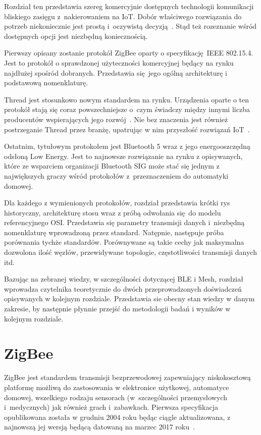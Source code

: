 Rozdział ten przedstawia szereg komercyjnie dostępnych technologii komunikacji
bliskiego zasięgu z~nakierowaniem na \gls{IoT}. Dobór właściwego rozwiązania do potrzeb
niekoniecznie jest prostą i~oczywistą decyzją~\cite{lethaby_wireless_2017, ray_edge_2019}.
Stąd też rozeznanie wśród dostępnych opcji jest niezbędną koniecznością.

Pierwszy opisany zostanie protokół ZigBee oparty o specyfikację IEEE 802.15.4. Jest to protokół
o sprawdzonej użyteczności komercyjnej będący na rynku najdłużej spośród dobranych.
Przedstawia się jego ogólną architekturę i podstawową nomenklaturę.

Thread jest stosunkowo nowym standardem na rynku. Urządzenia oparte o ten protokół stają
się coraz powszechniejsze o~czym świadczy między innymi liczba producentów wspierających
jego rozwój~\cite{noauthor_thread_nodate-1}. Nie bez znaczenia jest również postrzeganie
Thread przez branżę, upatrując w nim przyszłość rozwiązań IoT~\cite{curtis_ces_nodate-1}.

Ostatnim, tytułowym protokołem jest Bluetooth 5 wraz z jego energooszczędną odsłoną
Low Energy. Jest to najnowsze rozwiązanie na rynku z opisywanych, które ze wsparciem
organizacji Bluetooth SIG może stać się jednym z największych graczy wśród protokołów
z~przeznaczeniem do automatyki domowej.

Dla każdego z wymienionych protokołów, rozdział przedstawia krótki rys historyczny,
architekturę stosu wraz z próbą odwołania się do modelu referencyjnego OSI. Przedstawia
się parametry transmisji danych i~niezbędną nomenklaturę wprowadzoną przez standard.
Natępnie, następuje próba porównania tychże standardów. Porównywane są takie
cechy jak maksymalna dozwolona ilość węzłów, przewidywane topologie,
częstotliwości transmisji danych itd.

Bazując na zebranej wiedzy, w szczególności dotyczącej BLE i Mesh, rozdział wprowadza
czytelnika teoretycznie do dwóch przeprowadzonych doświadczeń opisywanych w kolejnym
rozdziale. Przedstawia sie obecny stan wiedzy w danym zakresie, by następnie płynnie
przejść do metodologii badań i wyników w kolejnym rozdziale.

\section{ZigBee}

ZigBee jest standardem transmisji bezprzewodowej zapewniający niskokosztową platformę
możliwą do zastosowania w elektronice użytkowej, automatyce domowej, wszelkiego rodzaju sensorach
(w~szczególności przemysłowych i~medycznych) jak również grach i~zabawkach.
Pierwsza specyfikacja opublikowana została w grudniu 2004 roku będąc ciągle aktualizowana,
z najnowszą jej wersją będącą datowaną na marzec 2017 roku~\cite{zigbee_alliance_zigbee_2017}.

